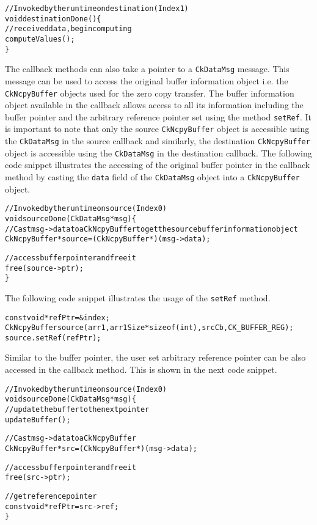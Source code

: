 \begin{alltt}
// Invoked by the runtime on destination (Index 1)
void destinationDone() \{
    // received data, begin computing
    computeValues();
\}
\end{alltt}

The callback methods can also take a pointer to a \texttt{CkDataMsg} message. This message can be
used to access the original buffer information object i.e. the \texttt{CkNcpyBuffer} objects used for the
zero copy transfer. The buffer information object available in the callback allows access to all its
information including the buffer pointer and the arbitrary reference pointer set using the method
\texttt{setRef}. It is important to note that only the source \texttt{CkNcpyBuffer} object is accessible
using the \texttt{CkDataMsg} in the source callback and similarly, the destination \texttt{CkNcpyBuffer} object
is accessible using the \texttt{CkDataMsg} in the destination callback.
The following code snippet illustrates the accessing of the original buffer pointer in the callback
method by casting the \texttt{data} field of the \texttt{CkDataMsg} object into a \texttt{CkNcpyBuffer} object.

\begin{alltt}
// Invoked by the runtime on source (Index 0)
void sourceDone(CkDataMsg *msg) \{
    // Cast msg->data to a CkNcpyBuffer to get the source buffer information object
    CkNcpyBuffer *source = (CkNcpyBuffer *)(msg->data);

    // access buffer pointer and free it
    free(source->ptr);
\}
\end{alltt}

The following code snippet illustrates the usage of the \texttt{setRef} method.

\begin{alltt}
const void *refPtr = &index;
CkNcpyBuffer source(arr1, arr1Size * sizeof(int), srcCb, CK_BUFFER_REG);
source.setRef(refPtr);
\end{alltt}

Similar to the buffer pointer, the user set arbitrary reference pointer can be also accessed in the
callback method. This is shown in the next code snippet.

\begin{alltt}
// Invoked by the runtime on source (Index 0)
void sourceDone(CkDataMsg *msg) \{
    // update the buffer to the next pointer
    updateBuffer();

    // Cast msg->data to a CkNcpyBuffer
    CkNcpyBuffer *src = (CkNcpyBuffer *)(msg->data);

    // access buffer pointer and free it
    free(src->ptr);

    // get reference pointer
    const void *refPtr = src->ref;
\}
\end{alltt}

